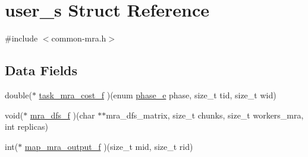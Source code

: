 \hypertarget{structuser__s}{\section{user\-\_\-s \-Struct \-Reference}
\label{structuser__s}
}


{\ttfamily \#include $<$common-\/mra.\-h$>$}

\subsection*{\-Data \-Fields}
\begin{DoxyCompactItemize}
\item 
double($\ast$ \hyperlink{structuser__s_aa32af3ea6ee92e53a04476911d65f2c1}{task\-\_\-mra\-\_\-cost\-\_\-f} )(enum \hyperlink{mra_8h_afa14b6e068c0e0b8557777e16f2582f2}{phase\-\_\-e} phase, size\-\_\-t tid, size\-\_\-t wid)
\item 
void($\ast$ \hyperlink{structuser__s_a832e7d465f899e75aa7fe1d72987c5d2}{mra\-\_\-dfs\-\_\-f} )(char $\ast$$\ast$mra\-\_\-dfs\-\_\-matrix, size\-\_\-t chunks, size\-\_\-t workers\-\_\-mra, int replicas)
\item 
int($\ast$ \hyperlink{structuser__s_ab9a47b1668a675fb95ca6489d1da13a7}{map\-\_\-mra\-\_\-output\-\_\-f} )(size\-\_\-t mid, size\-\_\-t rid)
\end{DoxyCompactItemize}


